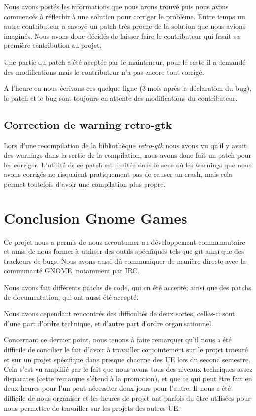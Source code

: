 \documentclass[12pt]{report}
\begin{document}
Nous avons postés les informations que nous avons trouvé puis nous avons
commencés à réflechir à une solution pour corriger le problème. Entre temps un
autre contributeur a envoyé un patch très proche de la solution que nous
avions imaginés. Nous avons donc décidés de laisser faire le contributeur qui
fesait sa première contribution au projet. %

Une partie du patch a été aceptée par le mainteneur, pour le reste il a
demandé des modifications mais le contributeur n'a pas encore tout corrigé.

A l'heure ou nous écrivons ces quelque ligne (3 mois après la déclaration
du bug), le patch et le bug sont toujours en attente des modifications du
contributeur.

\subsection{Correction de warning retro-gtk}
Lors d'une recompilation de la bibliothèque \textit{retro-gtk} nous avons
vu qu'il y avait des warnings dans la sortie de la compilation, nous
avons donc fait un patch pour les corriger. L'utilité de ce patch est limitée
dans le sens où les warnings que nous avons corrigés ne risquaient
pratiquement pas de causer un crash, mais cela permet toutefois d'avoir une
compilation plus propre.

\newpage
\section{Conclusion Gnome Games}
Ce projet nous a permis de nous accoutumer au développement
communautaire et ainsi de nous former à utiliser des outils
spécifiques tels que git ainsi que des trackeurs de bugs. Nous avons
aussi dû communiquer de manière directe avec la communauté GNOME,
notamment par IRC.

Nous avons fait différents patchs de code, qui on été accepté;
ainsi que des patchs de documentation, qui ont aussi été accepté.

Nous avons cependant rencontrés des difficultés de deux sortes,
celles-ci sont d'une part d'ordre technique, et d'autre part d'ordre
organisationnel.

Concernant ce dernier point, nous tenons à faire remarquer qu'il nous
a été difficile de concilier le fait d'avoir à travailler
conjointement sur le projet tuteuré et sur un projet spécifique dans
presque chacune des UE lors du second semestre.
Cela s'est vu amplifié par le fait que nous avons tous des niveaux techniques
assez disparates (cette remarque s'étend à la promotion), et que ce qui peut
être fait en deux heures pour l'un peut nécessiter deux jours pour
l'autre.
Il nous a été difficile de nous organiser et les heures de projet ont parfois
du être utilisées pour nous permettre de travailler sur les projets des
autres UE.
\end{document}
